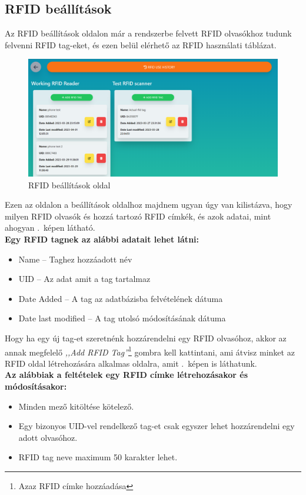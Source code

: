 \documentclass[
]{thesis-ekf}
\theoremstyle{definition}
\theoremstyle{remark}
\begin{document}
	\subsection{RFID beállítások}
	
	Az RFID beállítások oldalon már a rendszerbe felvett RFID olvasókhoz tudunk felvenni RFID tag-eket, és ezen belül elérhető az RFID használati táblázat.\\
	\begin{figure}[ht!]
		\centering
		\includegraphics[width=1\textwidth]{./src/pages_img/rfid-settings}
		\caption{RFID beállítások oldal}
		\label{rfid-settings}
	\end{figure}
	Ezen az oldalon a beállítások oldalhoz majdnem ugyan úgy van kilistázva, hogy milyen RFID olvasók és hozzá tartozó RFID címkék, és azok adatai, mint ahogyan .~képen látható.\\
	\textbf{Egy RFID tagnek az alábbi adatait lehet látni:}
	\begin{itemize}
		\item Name -- Taghez hozzáadott név
		\item UID -- Az adat amit a tag tartalmaz
		\item Date Added -- A tag az adatbázisba felvételének dátuma
		\item Date last modified -- A tag utolsó módosításának dátuma
	\end{itemize}
	Hogy ha egy új tag-et szeretnénk hozzárendelni egy RFID olvasóhoz, akkor az annak megfelelő \emph{,,Add RFID Tag''}\footnote{Azaz RFID címke hozzáadása} gombra kell kattintani, ami átvisz minket az RFID oldal létrehozására alkalmas oldalra, amit .~képen is láthatunk.\\
	\textbf{Az alábbiak a feltételek egy RFID címke létrehozásakor és módosításakor:}
	\begin{itemize}
		\item Minden mező kitöltése kötelező.
		\item Egy bizonyos UID-vel rendelkező tag-et csak egyszer lehet hozzárendelni egy adott olvasóhoz.
		\item RFID tag neve maximum 50 karakter lehet.
	\end{itemize}
	
\end{document}
